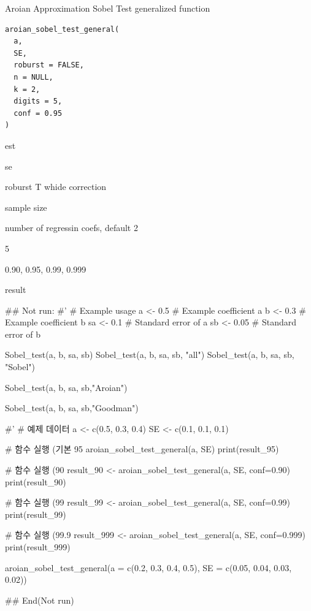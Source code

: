 \documentclass[a4paper]{book}
\begin{document}
%
\begin{Description}
Aroian Approximation Sobel Test generalized function
\end{Description}
%
\begin{Usage}
\begin{verbatim}
aroian_sobel_test_general(
  a,
  SE,
  roburst = FALSE,
  n = NULL,
  k = 2,
  digits = 5,
  conf = 0.95
)
\end{verbatim}
\end{Usage}
%
\begin{Arguments}
\begin{ldescription}
\item[\code{a}] est

\item[\code{SE}] se

\item[\code{roburst}] roburst T whide correction

\item[\code{n}] sample size

\item[\code{k}] number of regressin coefs, default 2

\item[\code{digits}] 5

\item[\code{conf}] 0.90, 0.95, 0.99, 0.999
\end{ldescription}
\end{Arguments}
%
\begin{Value}
result
\end{Value}
%
\begin{Examples}
\begin{ExampleCode}

\#\# Not run: 
#'
# Example usage
a <- 0.5  # Example coefficient a
b <- 0.3  # Example coefficient b
sa <- 0.1 # Standard error of a
sb <- 0.05 # Standard error of b

Sobel_test(a, b, sa, sb)
Sobel_test(a, b, sa, sb, "all")
Sobel_test(a, b, sa, sb, "Sobel")

Sobel_test(a, b, sa, sb,"Aroian")

Sobel_test(a, b, sa, sb,"Goodman")

#'
# 예제 데이터
a <- c(0.5, 0.3, 0.4)
SE <- c(0.1, 0.1, 0.1)

# 함수 실행 (기본 95%
aroian_sobel_test_general(a, SE)
print(result_95)

# 함수 실행 (90%
result_90 <- aroian_sobel_test_general(a, SE, conf=0.90)
print(result_90)

# 함수 실행 (99%
result_99 <- aroian_sobel_test_general(a, SE, conf=0.99)
print(result_99)

# 함수 실행 (99.9%
result_999 <- aroian_sobel_test_general(a, SE, conf=0.999)
print(result_999)


aroian_sobel_test_general(a = c(0.2, 0.3, 0.4, 0.5),
                          SE = c(0.05, 0.04, 0.03, 0.02))%


## End(Not run)
\end{ExampleCode}
\end{Examples}
\end{document}

